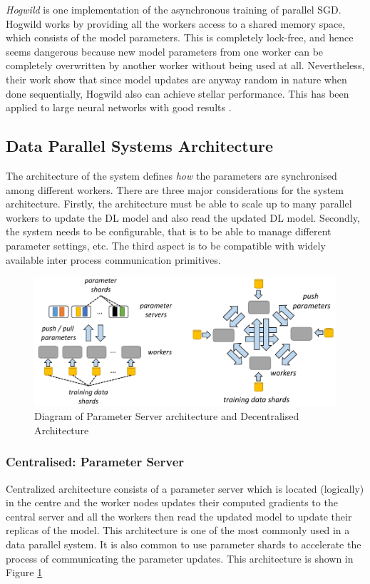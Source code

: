 \emph{Hogwild} \cite{NiuHOGWILD:Descent} is one implementation of the asynchronous training of parallel SGD. Hogwild works by providing all the workers access to a shared memory space, which consists of the model parameters. This is completely lock-free, and hence seems dangerous because new model parameters from one worker can be completely overwritten by another worker without being used at all. Nevertheless, their work show that since model updates are anyway random in nature when done sequentially, Hogwild also can achieve stellar performance. This has been applied to large neural networks with good results \cite{Deyringer2017ParallelizationHogwild}. 


\subsection{Data Parallel Systems Architecture}
The architecture of the system defines \emph{how} the parameters are synchronised among different workers. There are three major considerations for the system architecture. Firstly, the architecture must be able to scale up to many parallel workers to update the DL model and also read the updated DL model. Secondly, the system needs to be configurable, that is to be able to manage different parameter settings, etc. The third aspect is to be compatible with widely available inter process communication primitives.

\begin{figure}[ht]
  \begin{center}
    \includegraphics[width=\textwidth]{images/architecture_.png} 
    \caption{Diagram of Parameter Server architecture and Decentralised Architecture  \cite{Mayer2020ScalableInfrastructures}}
    \label{fig:arch}
  \end{center}
\end{figure}


\subsubsection{Centralised: Parameter Server}
Centralized architecture consists of a parameter server which is located (logically) in the centre and the worker nodes updates their computed gradients to the central server and all the workers then read the updated model to update their replicas of the model. This architecture is one of the most commonly used in a data parallel system. It is also common to use parameter shards to accelerate the process of communicating the parameter updates. This architecture is shown in Figure \ref{fig:arch}

